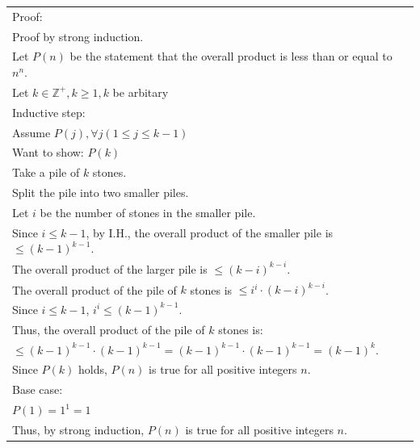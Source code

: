 \documentclass[12pt]{exam}
\begin{document}
\begin{solution}

	\begin{tabular}{ll}
		Proof:                                                                                   \\
		Proof by strong induction.                                                               \\
		Let $P(n)$ be the statement that the overall product is less than or equal to $n^n$.     \\
		Let $k\in \mathbb{Z}^+, k\ge 1, k$ be arbitary                                           \\
		Inductive step:                                                                          \\
		Assume $P(j), \forall j(1\le j\le k-1)$                                                  \\
		Want to show: $P(k)$                                                                     \\
		Take a pile of $k$ stones.                                                               \\
		Split the pile into two smaller piles.                                                   \\
		Let $i$ be the number of stones in the smaller pile.                                     \\
		Since $i\le k-1$, by I.H., the overall product of the smaller pile is $\le (k-1)^{k-1}$. \\
		The overall product of the larger pile is $\le (k-i)^{k-i}$.                             \\
		The overall product of the pile of $k$ stones is $\le i^{i}\cdot (k-i)^{k-i}$.           \\
		Since $i\le k-1$, $i^{i}\le (k-1)^{k-1}$.                                                \\
		Thus, the overall product of the pile of $k$ stones is:                                  \\
		$\le (k-1)^{k-1}\cdot (k-1)^{k-1}=(k-1)^{k-1}\cdot (k-1)^{k-1}=(k-1)^{k}$.               \\

		Since $P(k)$ holds, $P(n)$ is true for all positive integers $n$.                        \\
		Base case:                                                                               \\
		$P(1)=1^1=1$                                                                             \\
		Thus, by strong induction, $P(n)$ is true for all positive integers $n$.
	\end{tabular}


\end{solution}
\end{document}
